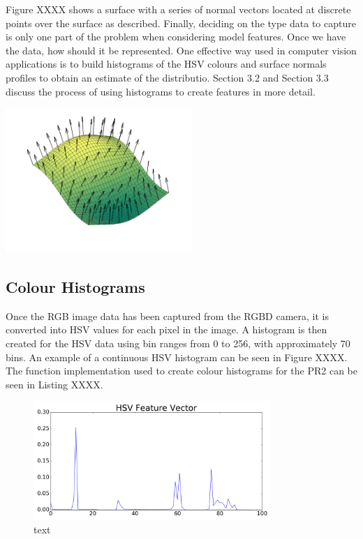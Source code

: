 \documentclass[a4paper]{article}
\begin{document}
\begin{minipage}{0.45\textwidth}
Figure XXXX shows a surface with a series of normal vectors located at discrete points over the surface as described. Finally, deciding on the type data to capture is only one part of the problem when considering model features. Once we have the data, how should it be represented. One effective way used in computer vision applications is to build histograms of the HSV colours and surface normals profiles to obtain an estimate of the distributio. Section 3.2 and Section 3.3 discuss the process of using histograms to create features in more detail.
\end{minipage}
	\hspace{1cm}
\begin{minipage}{0.45\textwidth}
	\centering
	\includegraphics[height=5.5cm]{surface_normals}
\end{minipage}


\subsection{Colour Histograms}
Once the RGB image data has been captured from the RGBD camera, it is converted into HSV values for each pixel in the image. A histogram is then created for the HSV data using bin ranges from 0 to 256, with approximately 70 bins. An example of a continuous HSV histogram can be seen in Figure XXXX. The function implementation used to create colour histograms for the PR2 can be seen in Listing XXXX.
\begin{figure}[h]
	\centering
	\includegraphics[height=4.5cm]{hsv_histo}
	\caption{text}
\end{figure}
\end{document}
